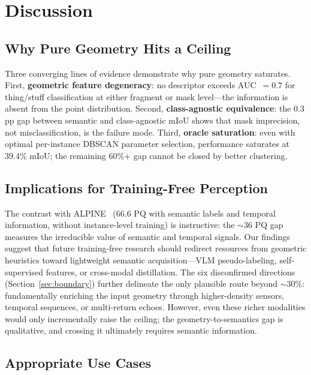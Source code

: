 \documentclass{article}
\begin{document}
\section{Discussion}

\subsection{Why Pure Geometry Hits a Ceiling}

Three converging lines of evidence demonstrate why pure geometry saturates.
First, \textbf{geometric feature degeneracy}: no descriptor exceeds AUC~$=0.7$ for
thing/stuff classification at either fragment or mask level---the information is
absent from the point distribution. Second, \textbf{class-agnostic equivalence}:
the 0.3 pp gap between semantic and class-agnostic mIoU shows that mask imprecision,
not misclassification, is the failure mode. Third, \textbf{oracle saturation}: even
with optimal per-instance DBSCAN parameter selection, performance saturates at
39.4\% mIoU; the remaining 60\%+ gap cannot be closed by better clustering.

\subsection{Implications for Training-Free Perception}

The contrast with ALPINE~\cite{sautier2025alpine} (66.6 PQ with semantic labels and
temporal information, without instance-level training) is instructive: the $\sim$36
PQ gap measures the irreducible value of semantic and temporal signals. Our findings
suggest that future training-free research should redirect resources from geometric
heuristics toward lightweight semantic acquisition---VLM pseudo-labeling,
self-supervised features, or cross-modal distillation. The six disconfirmed
directions (Section~\ref{sec:boundary}) further delineate the only plausible route
beyond $\sim$30\%: fundamentally enriching the input geometry through
higher-density sensors, temporal sequences, or multi-return echoes. However, even
these richer modalities would only incrementally raise the ceiling; the
geometry-to-semantics gap is qualitative, and crossing it ultimately requires
semantic information.

\subsection{Appropriate Use Cases}
\end{document}
